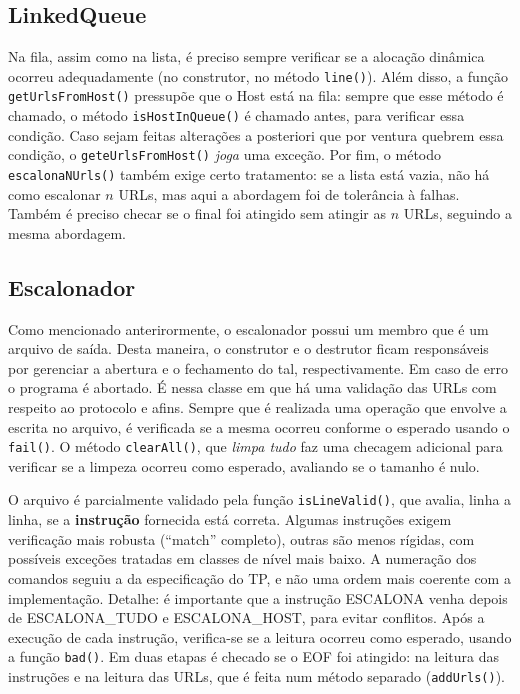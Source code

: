 \documentclass{article}
\def\code#1{\texttt{#1}}
\begin{document}
\subsection{LinkedQueue}

Na fila, assim como na lista, é preciso sempre verificar se a alocação dinâmica ocorreu adequadamente (no construtor, no método \code{line()}). Além disso, a função \code{getUrlsFromHost()} pressupõe que o Host está na fila: sempre que esse método é chamado, o método \code{isHostInQueue()} é chamado antes, para verificar essa condição. Caso sejam feitas alterações a posteriori que por ventura quebrem essa condição, o \code{geteUrlsFromHost()} \textit{joga} uma exceção. Por fim, o método \code{escalonaNUrls()} também exige certo tratamento: se a lista está vazia, não há como escalonar \( n \) URLs, mas aqui a abordagem foi de tolerância à falhas. Também é preciso checar se o final foi atingido sem atingir as \( n \) URLs, seguindo a mesma abordagem. 

\subsection{Escalonador}

Como mencionado anterirormente, o escalonador possui um membro que é um arquivo de saída. Desta maneira, o construtor e o destrutor ficam responsáveis por gerenciar a abertura e o fechamento do tal, respectivamente. Em caso de erro o programa é abortado. É nessa classe em que há uma validação das URLs com respeito ao protocolo e afins. Sempre que é realizada uma operação que envolve a escrita no arquivo, é verificada se a mesma ocorreu conforme o esperado usando o \code{fail()}. O método \code{clearAll()}, que \textit{limpa tudo} faz uma checagem adicional para verificar se a limpeza ocorreu como esperado, avaliando se o tamanho é nulo.

O arquivo é parcialmente validado pela função \code{isLineValid()}, que avalia, linha a linha, se a \textbf{instrução} fornecida está correta. Algumas instruções exigem verificação mais robusta (``match'' completo), outras são menos rígidas, com possíveis exceções tratadas em classes de nível mais baixo. A numeração dos comandos seguiu a da especificação do TP, e não uma ordem mais coerente com a implementação. Detalhe: é importante que a instrução ESCALONA venha depois de ESCALONA\_TUDO e ESCALONA\_HOST, para evitar conflitos. Após a execução de cada instrução, verifica-se se a leitura ocorreu como esperado, usando a função \code{bad()}. Em duas etapas é checado se o EOF foi atingido: na leitura das instruções e na leitura das URLs, que é feita num método separado (\code{addUrls()}).
\end{document}
